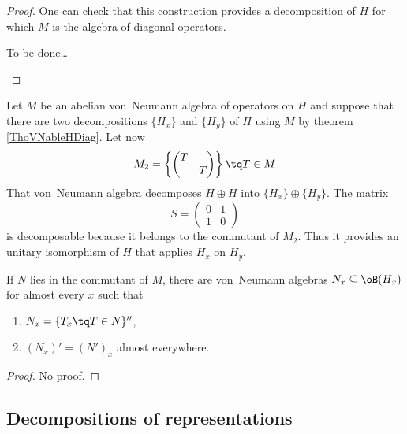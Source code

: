 \begin{proof}
	One can check that this construction provides a decomposition of $H$ for which $M$ is the algebra of diagonal operators.

	\begin{probleme}
	To be done\ldots 
	\end{probleme}
\end{proof}

Let $M$ be an abelian von~Neumann algebra of operators on $H$ and suppose that there are two decompositions $\{ H_x \}$ and $\{ H_y \}$ of $H$ using $M$ by theorem \ref{ThoVNableHDiag}. Let now 
\begin{equation}
	M_2=
\left\{ 
\begin{pmatrix}
  T	&		\\ 
  	&	T	
\end{pmatrix}
 \right\}\tq T\in M
\end{equation}
That von~Neumann algebra decomposes $H\oplus H$ into $\{ H_x \}\oplus\{ H_y \}$. The matrix
\begin{equation}
	S=
\begin{pmatrix}
  0	&	1	\\ 
  1	&	0	
\end{pmatrix}
\end{equation}
is decomposable because it belongs to the commutant of $M_2$. Thus it provides an unitary isomorphism of $H$ that applies $H_x$ on $H_y$.

\begin{proposition}		\label{PropNprimexxNprime}
	If $N$ lies in the commutant of $M$, there are von~Neumann algebras $N_x\subseteq\oB(H_x)$ for almost every $x$ such that
	\begin{enumerate}
		\item $N_x=\{ T_x\tq T\in N \}''$,
		\item $(N_x)'=(N')_x$ almost everywhere.
	\end{enumerate}
\end{proposition}

\begin{proof}
No proof.
\end{proof}

					\subsection{Decompositions of representations}



